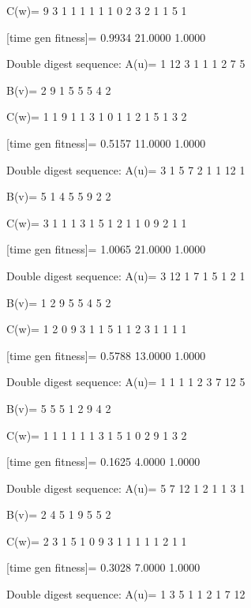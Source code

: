 C(w)=
     9     3     1     1     1     1     1     1     0     2     3     2     1     1     5     1

[time gen fitness]=
    0.9934   21.0000    1.0000

Double digest sequence:
A(u)=
     1    12     3     1     1     1     2     7     5

B(v)=
     2     9     1     5     5     5     4     2

C(w)=
     1     1     9     1     1     3     1     0     1     1     2     1     5     1     3     2

[time gen fitness]=
    0.5157   11.0000    1.0000

Double digest sequence:
A(u)=
     3     1     5     7     2     1     1    12     1

B(v)=
     5     1     4     5     5     9     2     2

C(w)=
     3     1     1     1     3     1     5     1     2     1     1     0     9     2     1     1

[time gen fitness]=
    1.0065   21.0000    1.0000

Double digest sequence:
A(u)=
     3    12     1     7     1     5     1     2     1

B(v)=
     1     2     9     5     5     4     5     2

C(w)=
     1     2     0     9     3     1     1     5     1     1     2     3     1     1     1     1

[time gen fitness]=
    0.5788   13.0000    1.0000

Double digest sequence:
A(u)=
     1     1     1     1     2     3     7    12     5

B(v)=
     5     5     5     1     2     9     4     2

C(w)=
     1     1     1     1     1     1     3     1     5     1     0     2     9     1     3     2

[time gen fitness]=
    0.1625    4.0000    1.0000

Double digest sequence:
A(u)=
     5     7    12     1     2     1     1     3     1

B(v)=
     2     4     5     1     9     5     5     2

C(w)=
     2     3     1     5     1     0     9     3     1     1     1     1     1     2     1     1

[time gen fitness]=
    0.3028    7.0000    1.0000

Double digest sequence:
A(u)=
     1     3     5     1     1     2     1     7    12

